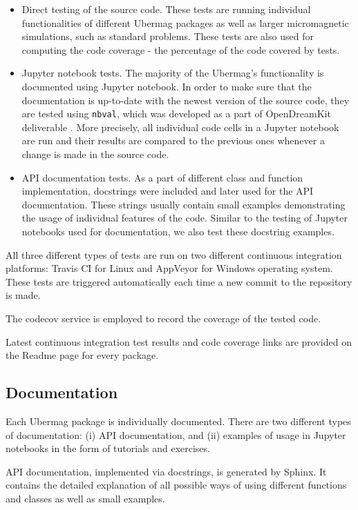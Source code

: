\documentclass{deliverablereport}
\begin{document}
\begin{itemize}
\item Direct testing of the source code. These tests are running
individual functionalities of different Ubermag packages as well as
larger micromagnetic simulations, such as standard problems. These
tests are also used for computing the code coverage - the percentage
of the code covered by tests.
\item Jupyter notebook tests. The majority of the Ubermag's
functionality is documented using Jupyter notebook. In order to make
sure that the documentation is up-to-date with the newest version of
the source code, they are tested using \texttt{nbval}, which was
developed as a part of OpenDreamKit deliverable
. More precisely, all individual code cells
in a Jupyter notebook are run and their results are compared to the
previous ones whenever a change is made in the source code.
\item API documentation tests. As a part of different class and
  function implementation, docstrings were included and later used for
  the API documentation. These strings usually contain small examples
  demonstrating the usage of individual features of the code. Similar
  to the testing of Jupyter notebooks used for documentation, we also
  test these docstring examples.
\end{itemize}

All three different types of tests are run on two different continuous
integration platforms: Travis CI for Linux and AppVeyor for Windows
operating system. These tests are triggered automatically each time a new commit to
the repository is made.

The codecov service is employed to record the
coverage of the tested code.

Latest continuous integration test results and code coverage links are
provided on the Readme page for every package.

\subsection{Documentation}

Each Ubermag package is individually
documented. There are two different types of documentation: (i) API
documentation, and (ii) examples of usage in Jupyter notebooks in the
form of tutorials and exercises.

API documentation, implemented via
docstrings, is generated by Sphinx. It contains the detailed
explanation of all possible ways of using different functions and
classes as well as small examples.
\end{document}
